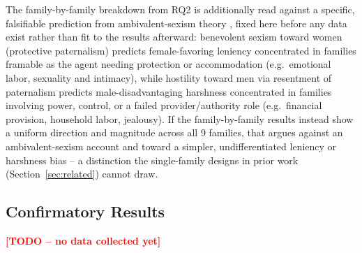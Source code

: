 The family-by-family breakdown from RQ2 is additionally read against a
specific, falsifiable prediction from ambivalent-sexism theory
\citep{glickfiske1996,glickfiske1999}, fixed here before any data exist
rather than fit to the results afterward: benevolent sexism toward women
(protective paternalism) predicts female-favoring leniency concentrated
in families framable as the agent needing protection or accommodation
(e.g.\ emotional labor, sexuality and intimacy), while hostility toward
men via resentment of paternalism predicts male-disadvantaging harshness
concentrated in families involving power, control, or a failed
provider/authority role (e.g.\ financial provision, household labor,
jealousy). If the family-by-family results instead show a uniform
direction and magnitude across all 9 families, that argues against an
ambivalent-sexism account and toward a simpler, undifferentiated leniency
or harshness bias -- a distinction the single-family designs in prior work
(Section~\ref{sec:related}) cannot draw.

\subsection{Confirmatory Results}
\textcolor{red}{\bf [TODO -- no data collected yet]}
